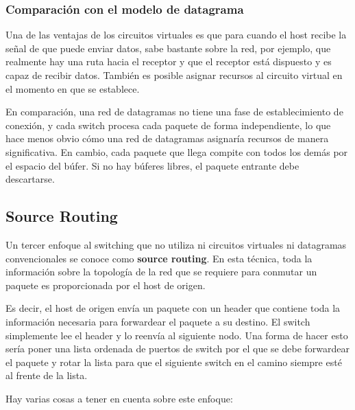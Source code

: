 \subsubsection{Comparación con el modelo de datagrama}

Una de las ventajas de los circuitos virtuales es que para cuando el host recibe la señal de que puede enviar datos, sabe bastante sobre la red, por ejemplo, que realmente hay una ruta hacia el receptor y que el receptor está dispuesto y es capaz de recibir datos. También es posible asignar recursos al circuito virtual en el momento en que se establece.

En comparación, una red de datagramas no tiene una fase de establecimiento de conexión, y cada switch procesa cada paquete de forma independiente, lo que hace menos obvio cómo una red de datagramas asignaría recursos de manera significativa. En cambio, cada paquete que llega compite con todos los demás por el espacio del búfer. Si no hay búferes libres, el paquete entrante debe descartarse.

\subsection{Source Routing}
Un tercer enfoque al switching que no utiliza ni circuitos virtuales ni datagramas convencionales se conoce como \textbf{source routing}. En esta técnica, toda la información sobre la topología de la red que se requiere para conmutar un paquete es proporcionada por el host de origen. 

Es decir, el host de origen envía un paquete con un header que contiene toda la información necesaria para forwardear el paquete a su destino. El switch simplemente lee el header y lo reenvía al siguiente nodo. Una forma de hacer esto sería poner una lista ordenada de puertos de switch por el que se debe forwardear el paquete y rotar la lista para que el siguiente switch en el camino siempre esté al frente de la lista.

Hay varias cosas a tener en cuenta sobre este enfoque:

